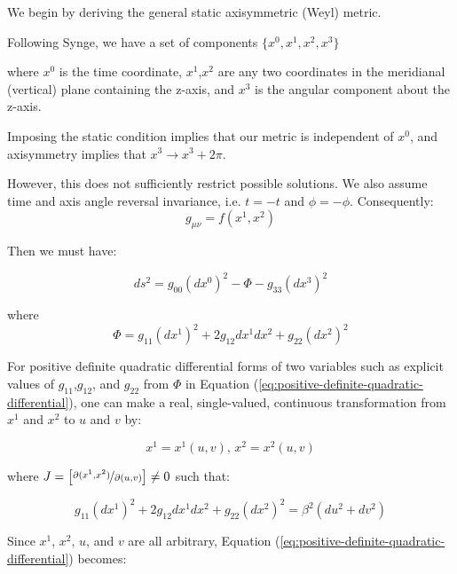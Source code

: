 \documentclass{article}
\begin{document}
We begin by deriving the general static axisymmetric (Weyl) metric.

Following Synge\cite{synge_relativity}, we have a set of components $\{x^0,x^1,x^2,x^3\}$ 

where $x^{0}$ is the time coordinate, $x^{1}$,$x^{2}$ are any two coordinates in the meridianal (vertical)
plane containing the z-axis, and $x^{3}$ is the angular component about the z-axis. 

Imposing the static condition implies that our metric is independent of $x^{0}$, and axisymmetry implies that $x^{3}\rightarrow x^{3}+2\pi$.

However, this does not sufficiently restrict possible solutions. We also assume time and axis angle reversal invariance, i.e. $t = -t$ and $\phi = -\phi$. Consequently:
\begin{equation}
g_{\mu\nu}=f\left(x^{1},x^{2}\right)
\end{equation}

Then we must have:

\begin{equation}
ds^{2}=g_{00}\left(dx^{0}\right)^{2}-\Phi -g_{33}\left(dx^{3}\right)^{2}\label{eq:positive-definite-quadratic-differential}
\end{equation}

where
\begin{equation}
\Phi=g_{11}\left(dx^{1}\right)^{2}+2g_{12}dx^{1}dx^{2}+g_{22}\left(dx^{2}\right)^{2}
\end{equation}

For positive definite quadratic differential forms of two variables
such as explicit values of $g_{11}$,$g_{12}$, and $g_{22}$ from
$\Phi$ in Equation (\ref{eq:positive-definite-quadratic-differential}),
one can make a real, single-valued, continuous transformation from
$x^{1}$ and $x^{2}$ to $u$ and $v$ by:

\begin{equation}
x^{1}=x^{1}(u,v),\, x^{2}=x^{2}(u,v)
\end{equation}

where $J=\left[\nicefrac{\partial(x^{1},x^{2})}{\partial(u,v)}\right]\neq0$
such that:

\begin{equation}
g_{11}\left(dx^{1}\right)^{2}+2g_{12}dx^{1}dx^{2}+g_{22}\left(dx^{2}\right)^{2}=\beta^{2}\left(du^{2}+dv^{2}\right)
\end{equation}

Since $x^{1}$, $x^2$, $u$, and $v$ are all arbitrary, Equation (\ref{eq:positive-definite-quadratic-differential}) becomes:
\end{document}
